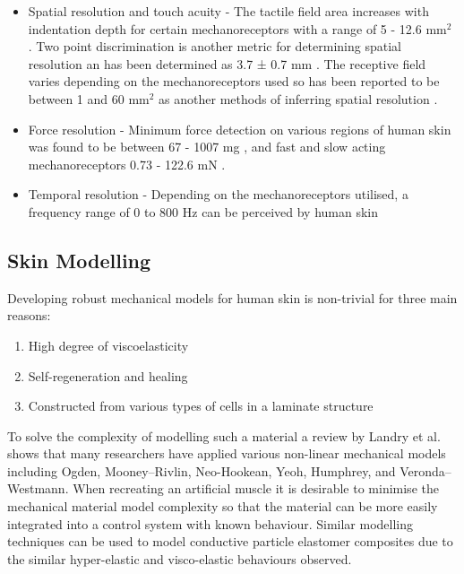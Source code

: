 \begin{itemize}
    \item Spatial resolution and touch acuity - The tactile field area increases with indentation depth for certain mechanoreceptors with a range of 5 - 12.6 mm$^2$ \cite{Deflorio2022}. Two point discrimination is another metric for determining spatial resolution an has been determined as 3.7 ± 0.7 mm \cite{Yokota2020}. The receptive field varies depending on the mechanoreceptors used so has been reported to be between 1 and 60 mm$^2$ as another methods of inferring spatial resolution \cite{Roudaut2012}.
    \item Force resolution - Minimum force detection on various regions of human skin was found to be between 67 - 1007 mg \cite{Ackerley2014}, and fast and slow acting  mechanoreceptors 0.73 - 122.6 mN \cite{Strzalkowski2015}.
    \item Temporal resolution - Depending on the mechanoreceptors utilised, a frequency range of 0 to 800 Hz can be perceived by human skin \cite{Deflorio2022}
\end{itemize}


\subsection{Skin Modelling}
Developing robust mechanical models for human skin is non-trivial for three main reasons:
\begin{enumerate}
    \item High degree of viscoelasticity
    \item Self-regeneration and healing
    \item Constructed from various types of cells in a laminate structure 
\end{enumerate}
To solve the complexity of modelling such a material a review by Landry et al. \cite{Landry2021} shows that many researchers have applied various non-linear mechanical models including Ogden, Mooney–Rivlin, Neo-Hookean, Yeoh, Humphrey, and Veronda–Westmann. When recreating an artificial muscle it is desirable to minimise the mechanical material model complexity so that the material can be more easily integrated into a control system with known behaviour. Similar modelling techniques can be used to model conductive particle elastomer composites due to the similar hyper-elastic and visco-elastic behaviours observed.




